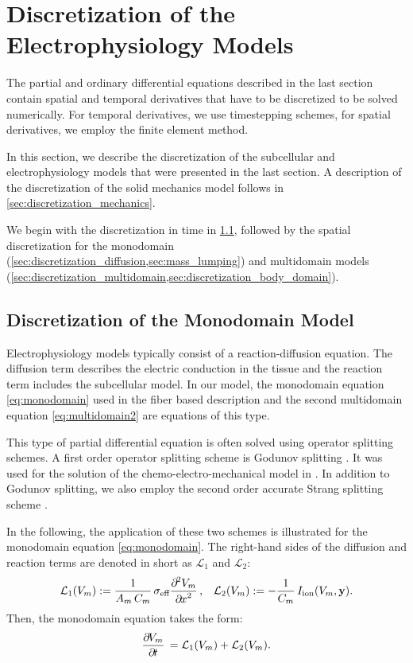 \section{Discretization of the Electrophysiology Models}\label{sec:discretization}

The partial and ordinary differential equations described in the last section contain spatial and temporal derivatives that have to be discretized to be solved numerically. For temporal derivatives, we use timestepping schemes, for spatial derivatives, we employ the finite element method.

In this section, we describe the discretization of the subcellular and electrophysiology models that were presented in the last section. A description of the discretization of the solid mechanics model follows in \cref{sec:discretization_mechanics}.

We begin with the discretization in time in \cref{sec:discretization_monodomain}, followed by the spatial discretization for the monodomain (\cref{sec:discretization_diffusion,sec:mass_lumping}) and multidomain models (\cref{sec:discretization_multidomain,sec:discretization_body_domain}).

\subsection{Discretization of the Monodomain Model}\label{sec:discretization_monodomain}

Electrophysiology models typically consist of a reaction-diffusion equation. The diffusion term describes the electric conduction in the tissue and the reaction term includes the subcellular model. In our model, the monodomain equation  \cref{eq:monodomain} used in the fiber based description and the second multidomain equation \cref{eq:multidomain2} are equations of this type.

This type of partial differential equation is often solved using operator splitting schemes. A first order operator splitting scheme is Godunov splitting \cite{Godunov2003}. It was used for the solution of the chemo-electro-mechanical model in \cite{Roehrle2012}. In addition to Godunov splitting, we also employ the second order accurate Strang splitting scheme \cite{Strang1968}.

In the following, the application of these two schemes is illustrated for the monodomain equation \cref{eq:monodomain}. The right-hand sides of the diffusion and reaction terms are denoted in short as $\mathcal{L}_1$ and $\mathcal{L}_2$:%
\begin{align*}
  \mathcal{L}_1(V_m) := \dfrac{1}{A_m\,C_m} \sigma_\text{eff}\dfrac{\partial^2 V_m}{\partial x^2}, &&
  \mathcal{L}_2(V_m) := -\dfrac{1}{C_m} I_\text{ion}(V_m,\bfy).
\end{align*}
%
Then, the monodomain equation takes the form:
%
\begin{align}\label{eq:monodomain_operator_splitting}
  \p{V_m}{t} = \mathcal{L}_1(V_m) + \mathcal{L}_2(V_m).
\end{align}

